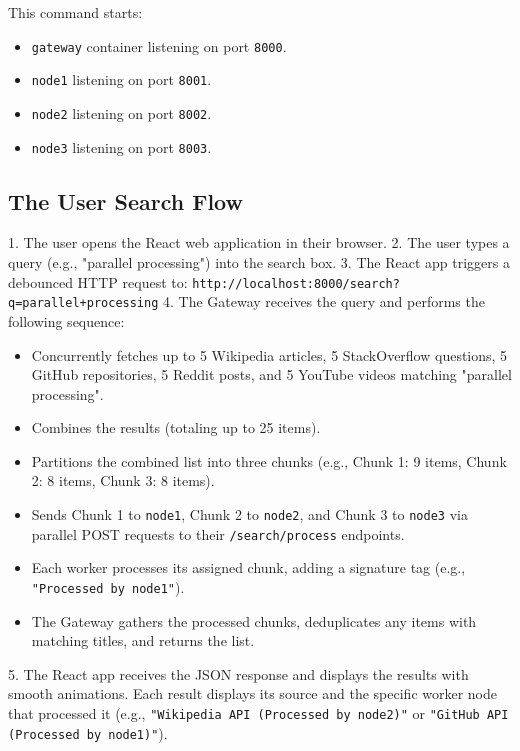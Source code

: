 \documentclass[11pt,a4paper]{article}
\begin{document}
This command starts:
\begin{itemize}
    \item \texttt{gateway} container listening on port \texttt{8000}.
    \item \texttt{node1} listening on port \texttt{8001}.
    \item \texttt{node2} listening on port \texttt{8002}.
    \item \texttt{node3} listening on port \texttt{8003}.
\end{itemize}

\subsection{The User Search Flow}
1. The user opens the React web application in their browser.
2. The user types a query (e.g., "parallel processing") into the search box.
3. The React app triggers a debounced HTTP request to:
   \texttt{http://localhost:8000/search?q=parallel+processing}
4. The Gateway receives the query and performs the following sequence:
    \begin{itemize}
        \item Concurrently fetches up to 5 Wikipedia articles, 5 StackOverflow questions, 5 GitHub repositories, 5 Reddit posts, and 5 YouTube videos matching "parallel processing".
        \item Combines the results (totaling up to 25 items).
        \item Partitions the combined list into three chunks (e.g., Chunk 1: 9 items, Chunk 2: 8 items, Chunk 3: 8 items).
        \item Sends Chunk 1 to \texttt{node1}, Chunk 2 to \texttt{node2}, and Chunk 3 to \texttt{node3} via parallel POST requests to their \texttt{/search/process} endpoints.
        \item Each worker processes its assigned chunk, adding a signature tag (e.g., \texttt{"Processed by node1"}).
        \item The Gateway gathers the processed chunks, deduplicates any items with matching titles, and returns the list.
    \end{itemize}
5. The React app receives the JSON response and displays the results with smooth animations. Each result displays its source and the specific worker node that processed it (e.g., \texttt{"Wikipedia API (Processed by node2)"} or \texttt{"GitHub API (Processed by node1)"}).

\newpage
\end{document}

